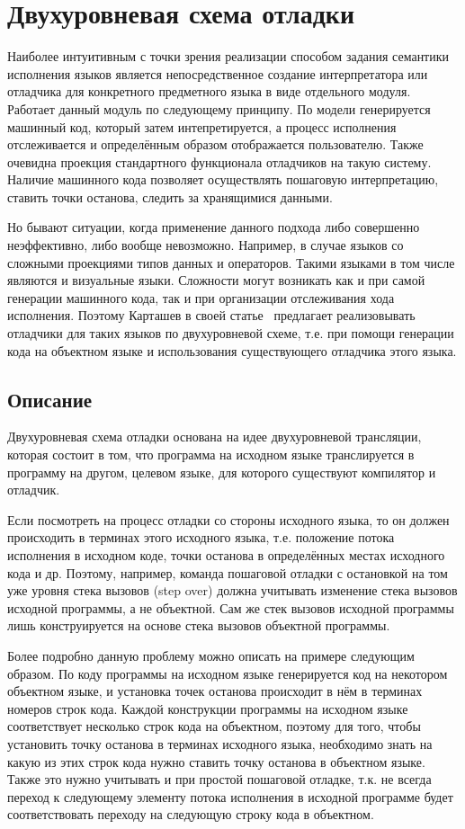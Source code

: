 \documentclass[a5paper]{article}
\begin{document}
\section{Двухуровневая схема отладки}

Наиболее интуитивным с точки зрения реализации способом задания семантики исполнения языков является непосредственное создание интерпретатора или отладчика для конкретного предметного языка в виде отдельного модуля. Работает данный модуль по следующему принципу. По модели генерируется машинный код, который затем интепретируется, а процесс исполнения отслеживается и определённым образом отображается пользователю. Также очевидна проекция стандартного функционала отладчиков на такую систему. Наличие машинного кода позволяет осуществлять пошаговую интерпретацию, ставить точки останова, следить за хранящимися данными.

Но бывают ситуации, когда применение данного подхода либо совершенно неэффективно, либо вообще невозможно. Например, в случае языков со сложными проекциями типов данных и операторов. Такими языками в том числе являются и визуальные языки. Сложности могут возникать как и при самой генерации машинного кода, так и при организации отслеживания хода исполнения. Поэтому Карташев в своей статье~\cite{kartashev} предлагает реализовывать отладчики для таких языков по двухуровневой схеме, т.е. при помощи генерации кода на объектном языке и использования существующего отладчика этого языка.

\subsection{Описание}

Двухуровневая схема отладки основана на идее двухуровневой трансляции, которая состоит в том, что программа на исходном языке транслируется в программу на другом, целевом языке, для которого существуют компилятор и отладчик.

Если посмотреть на процесс отладки со стороны исходного языка, то он должен происходить в терминах этого исходного языка, т.е. положение потока исполнения в исходном коде, точки останова в определённых местах исходного кода и др. Поэтому, например, команда пошаговой отладки с остановкой на том уже уровня стека вызовов (step over) должна учитывать изменение стека вызовов исходной программы, а не объектной. Сам же стек вызовов исходной программы лишь конструируется на основе стека вызовов объектной программы.

Более подробно данную проблему можно описать на примере следующим образом. По коду программы на исходном языке генерируется код на некотором объектном языке, и установка точек останова происходит в нём в терминах номеров строк кода. Каждой конструкции программы на исходном языке соответствует несколько строк кода на объектном, поэтому для того, чтобы установить точку останова в терминах исходного языка, необходимо знать на какую из этих строк кода нужно ставить точку останова в объектном языке. Также это нужно учитывать и при простой пошаговой отладке, т.к. не всегда переход к следующему элементу потока исполнения в исходной программе будет соответствовать переходу на следующую строку кода в объектном.
\end{document}
